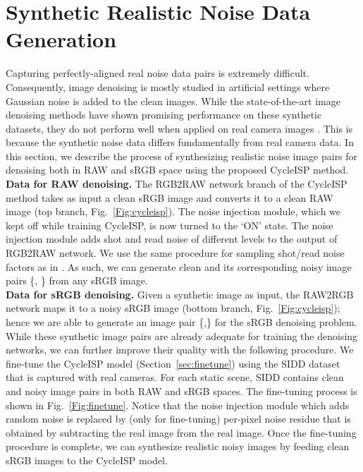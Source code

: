 \documentclass[10pt,twocolumn,letterpaper]{article}
\begin{document}
\section{Synthetic Realistic Noise Data Generation}
\label{sec:finetune noisy}
Capturing perfectly-aligned real noise data pairs 
is extremely difficult. 
Consequently, image denoising is mostly studied in artificial settings where Gaussian noise is added to the clean images. 
While the state-of-the-art image denoising methods \cite{MLP,DnCNN} have shown promising performance on these synthetic datasets, they do not perform well when applied on real camera images \cite{sidd,dnd}. 
This is because the synthetic noise data differs fundamentally from real camera data. 
In this section, we describe the process of synthesizing realistic noise image pairs for denoising both in RAW and sRGB space using the proposed CycleISP method. 
\vspace{0.4em}\\
\noindent \textbf{Data for RAW denoising.}
The RGB2RAW network branch of the CycleISP method takes as input a clean sRGB image and converts it to a clean RAW image (top branch, Fig.~\ref{Fig:cycleisp}). 
The noise injection module, which we kept off while training CycleISP, is now turned to the `ON' state. 
The noise injection module adds shot and read noise of different levels to the output of RGB2RAW network. 
We use the same procedure for sampling shot/read noise factors as in \cite{Brooks2019}. 
As such,  we can generate clean and its corresponding noisy image pairs \{, \} from any sRGB image.   
\vspace{0.4em}\\
\noindent \textbf{Data for sRGB denoising.}
Given a synthetic  image as input, the RAW2RGB network maps it to a noisy sRGB image (bottom branch, Fig.~\ref{Fig:cycleisp}); hence we are able to generate an image pair \{,\} for the sRGB denoising problem. 
While these synthetic image pairs are already adequate for training the denoising networks, we can further improve their quality with the following procedure. 
We fine-tune the CycleISP model (Section~\ref{sec:finetune}) using the SIDD dataset \cite{sidd} that is captured with real cameras. 
For each static scene, SIDD contains clean and noisy image pairs in both RAW and sRGB spaces.  
The fine-tuning process is shown in Fig.~\ref{Fig:finetune}. 
Notice that the noise injection module which adds random noise is replaced by (only for fine-tuning) per-pixel noise residue that is obtained by subtracting the real  image from the real  image. 
Once the fine-tuning procedure is complete, we can synthesize realistic noisy images by feeding clean sRGB images to the CycleISP model.
\end{document}
